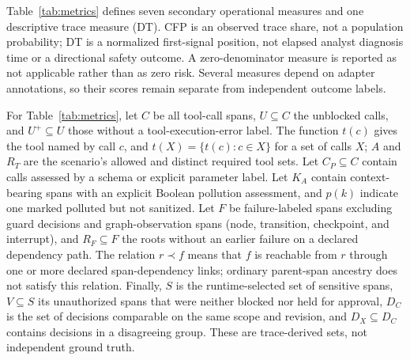 Table~\ref{tab:metrics} defines seven secondary operational measures and one descriptive trace measure (DT). CFP is an observed trace share, not a population probability; DT is a normalized first-signal position, not elapsed analyst diagnosis time or a directional safety outcome. A zero-denominator measure is reported as not applicable rather than as zero risk. Several measures depend on adapter annotations, so their scores remain separate from independent outcome labels.

For Table~\ref{tab:metrics}, let $C$ be all tool-call spans, $U\subseteq C$ the unblocked calls, and $U^+\subseteq U$ those without a tool-execution-error label. The function $t(c)$ gives the tool named by call $c$, and $t(X)=\{t(c):c\in X\}$ for a set of calls $X$; $A$ and $R_T$ are the scenario's allowed and distinct required tool sets. Let $C_P\subseteq C$ contain calls assessed by a schema or explicit parameter label. Let $K_A$ contain context-bearing spans with an explicit Boolean pollution assessment, and $p(k)$ indicate one marked polluted but not sanitized. Let $F$ be failure-labeled spans excluding guard decisions and graph-observation spans (node, transition, checkpoint, and interrupt), and $R_F\subseteq F$ the roots without an earlier failure on a declared dependency path. The relation $r\prec f$ means that $f$ is reachable from $r$ through one or more declared span-dependency links; ordinary parent-span ancestry does not satisfy this relation. Finally, $S$ is the runtime-selected set of sensitive spans, $V\subseteq S$ its unauthorized spans that were neither blocked nor held for approval, $D_C$ is the set of decisions comparable on the same scope and revision, and $D_X\subseteq D_C$ contains decisions in a disagreeing group. These are trace-derived sets, not independent ground truth.

